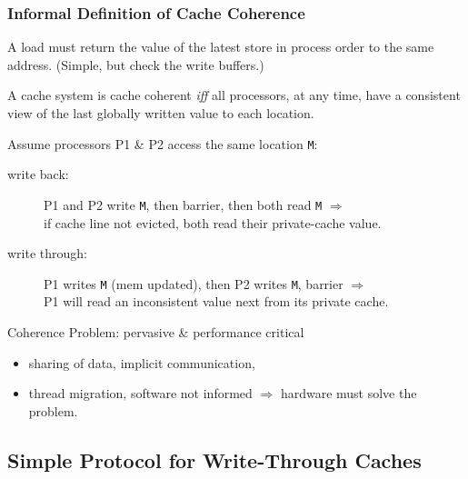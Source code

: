 \documentclass{beamer}
\begin{document}
\begin{frame}[fragile,t]
\frametitle{Informal Definition of Cache Coherence}

\begin{definition}
A load must return the value of the latest store 
in process order to the same address. (Simple, but check the write buffers.)
\end{definition}

\begin{definition}
A cache system is cache coherent {\em iff} all processors, 
at any time, have a consistent view of the last 
globally written value to each location.
\end{definition}

Assume processors P1 \& P2 access the same location {\tt M}:
\begin{scriptsize}
\begin{description}
    \item[write back:] P1 and P2 write {\tt M}, then barrier, then both
        read {\tt M} $\Rightarrow$\\\pause
        if cache line not evicted, both read their private-cache value.\smallskip
    \item[write through:] P1 writes {\tt M} (mem updated), then P2 writes {\tt M}, barrier 
        $\Rightarrow$\\P1 will read an inconsistent value next from its private cache.
\end  {description}
\end {scriptsize}

\medskip

\alert{Coherence Problem: pervasive \& performance critical}
\begin{scriptsize}
\begin{itemize}
    \item sharing of data, implicit communication, 
    \item thread migration, software not informed $\Rightarrow$ hardware must solve the problem.
\end  {itemize}
\end {scriptsize}

\end{frame}


\subsection{Simple Protocol for Write-Through Caches}
\end{document}

